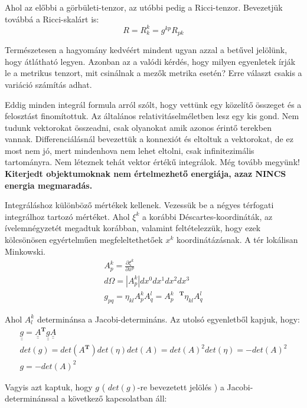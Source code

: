 \documentclass[a4paper,12pt]{article}
\def\doubleunderline#1{\underline{\underline{#1}}}
\begin{document}
\par Ahol az előbbi a görbületi-tenzor, az utóbbi pedig a Ricci-tenzor. Bevezetjük továbbá a Ricci-skalárt is:
\begin{equation*}
    R = R^{k}_{k} = g^{kp}R_{pk}
\end{equation*}
\par Természetesen a hagyomány kedvéért mindent ugyan azzal a betűvel jelölünk, hogy átlátható legyen. Azonban az a valódi kérdés, hogy milyen egyenletek írják le a metrikus tenzort, mit csinálnak a mezők metrika esetén? Erre választ csakis a variáció számítás adhat.
\par Eddig minden integrál formula arról szólt, hogy vettünk egy közelítő összeget és a felosztást finomítottuk. Az általános relativitáselméletben lesz egy kis gond. Nem tudunk vektorokat összeadni, csak olyanokat amik azonos érintő terekben vannak. Differenciálásnál bevezettük a konnexiót és eltoltuk a vektorokat, de ez most nem jó, mert mindenhova nem lehet eltolni, csak infinitezimális tartományra. Nem léteznek tehát vektor értékű integrálok. Még tovább megyünk! \textbf{Kiterjedt objektumoknak nem értelmezhető energiája, azaz NINCS energia megmaradás.}
\par Integráláshoz különböző mértékek kellenek. Vezessük be a négyes térfogati integrálhoz tartozó mértéket. Ahol $\xi^{k}$ a korábbi Déscartes-koordináták, az ívelemnégyzetét megadtuk korábban, valamint feltételezzük, hogy ezek kölcsönösen egyértelműen megfeleltethetőek $x^{k}$ koordinátázásnak. A tér lokálisan Minkowski.
\begin{align*}
    A^{k}_{p} = \frac{\partial \xi^{k}}{\partial x^{p}} \\
    d\Omega = |A^{k}_{p}|dx^{0}dx^{1}dx^{2}dx^{3} \\
    g_{pq} = \eta_{kl}A^{k}_{p}A^{l}_{q} = A^{k\quad\textbf{T}}_{p}\eta_{kl}A^{l}_{q}
\end{align*}
\par Ahol $A^{k}_{l}$ determinánsa a Jacobi-determináns. Az utolsó egyenletből kapjuk, hogy:
\begin{align*}
    \doubleunderline{g} = \doubleunderline{A}^{\textbf{T}}\doubleunderline{g}\doubleunderline{A} \\
    det(g) = det(A^{\textbf{T}})det(\eta)det(A) = det(A)^{2}det(\eta) = -det(A)^{2} \\
    g = -det(A)^{2}
\end{align*}
\par Vagyis azt kaptuk, hogy $g$ ( $det(g)$-re bevezetett jelölés ) a Jacobi-determinánssal a következő kapcsolatban áll:
\end{document}

